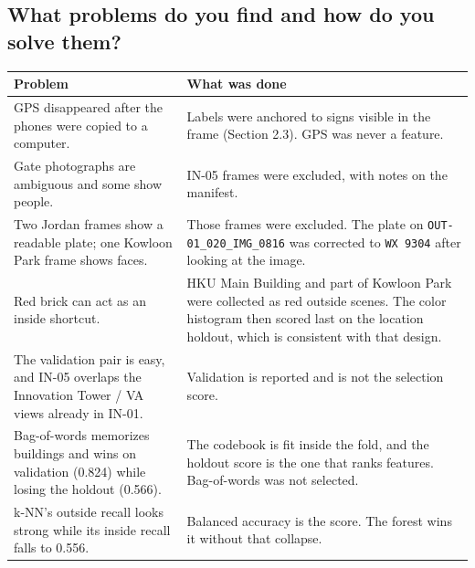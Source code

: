 \documentclass[11pt,a4paper]{article}
\providecommand{\real}[1]{#1}
\newcounter{none}
\begin{document}
\subsection{What problems do you find and how do you solve them?}\label{what-problems-do-you-find-and-how-do-you-solve-them}

{\def\LTcaptype{none} %
\begin{longtable}[]{@{}
  >{\raggedright\arraybackslash}p{(\linewidth - 2\tabcolsep) * \real{0.5000}}
  >{\raggedright\arraybackslash}p{(\linewidth - 2\tabcolsep) * \real{0.5000}}@{}}
\toprule\noalign{}
\begin{minipage}[b]{\linewidth}\raggedright
Problem
\end{minipage} & \begin{minipage}[b]{\linewidth}\raggedright
What was done
\end{minipage} \\
\midrule\noalign{}
\endhead
\bottomrule\noalign{}
\endlastfoot
GPS disappeared after the phones were copied to a computer. & Labels were anchored to signs visible in the frame (Section 2.3). GPS was never a feature. \\
Gate photographs are ambiguous and some show people. & 11 IN-05 frames were excluded, with notes on the manifest. \\
Two Jordan frames show a readable plate; one Kowloon Park frame shows faces. & Those frames were excluded. The plate on \texttt{OUT-\allowbreak{}01\_\allowbreak{}020\_\allowbreak{}IMG\_\allowbreak{}0816} was corrected to \texttt{WX\ 9304} after looking at the image. \\
Red brick can act as an inside shortcut. & HKU Main Building and part of Kowloon Park were collected as red outside scenes. The color histogram then scored last on the location holdout, which is consistent with that design. \\
The validation pair is easy, and IN-05 overlaps the Innovation Tower / VA views already in IN-01. & Validation is reported and is not the selection score. \\
Bag-of-words memorizes buildings and wins on validation (0.824) while losing the holdout (0.566). & The codebook is fit inside the fold, and the holdout score is the one that ranks features. Bag-of-words was not selected. \\
k-NN's outside recall looks strong while its inside recall falls to 0.556. & Balanced accuracy is the score. The forest wins it without that collapse. \\

\end{longtable}}
\end{document}
